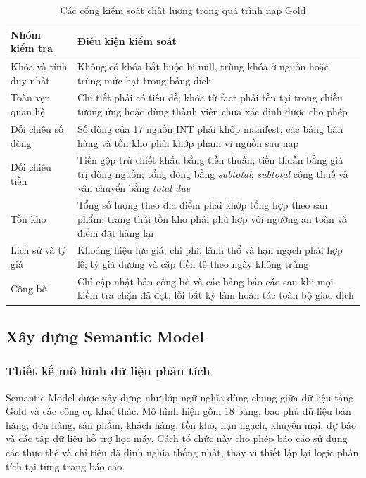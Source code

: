 \begin{table}[H]\centering
\caption{Các cổng kiểm soát chất lượng trong quá trình nạp Gold}
\label{tab:gold-dq-gates}
\begin{tabularx}{\textwidth}{|p{4.2cm}|X|}\hline
\textbf{Nhóm kiểm tra} & \textbf{Điều kiện kiểm soát} \\ \hline
Khóa và tính duy nhất & Không có khóa bắt buộc bị null, trùng khóa ở nguồn hoặc trùng mức hạt trong bảng đích \\ \hline
Toàn vẹn quan hệ & Chi tiết phải có tiêu đề; khóa từ fact phải tồn tại trong chiều tương ứng hoặc dùng thành viên chưa xác định được cho phép \\ \hline
Đối chiếu số dòng & Số dòng của 17 nguồn INT phải khớp manifest; các bảng bán hàng và tồn kho phải khớp phạm vi nguồn sau nạp \\ \hline
Đối chiếu tiền & Tiền gộp trừ chiết khấu bằng tiền thuần; tiền thuần bằng giá trị dòng nguồn; tổng dòng bằng \textit{subtotal}; \textit{subtotal} cộng thuế và vận chuyển bằng \textit{total due} \\ \hline
Tồn kho & Tổng số lượng theo địa điểm phải khớp tổng hợp theo sản phẩm; trạng thái tồn kho phải phù hợp với ngưỡng an toàn và điểm đặt hàng lại \\ \hline
Lịch sử và tỷ giá & Khoảng hiệu lực giá, chi phí, lãnh thổ và hạn ngạch phải hợp lệ; tỷ giá dương và cặp tiền tệ theo ngày không trùng \\ \hline
Công bố & Chỉ cập nhật bản công bố và các bảng báo cáo sau khi mọi kiểm tra chặn đã đạt; lỗi bất kỳ làm hoàn tác toàn bộ giao dịch \\ \hline
\end{tabularx}
\end{table}

\subsection{Xây dựng Semantic Model}

\subsubsection{Thiết kế mô hình dữ liệu phân tích}

Semantic Model được xây dựng như lớp ngữ nghĩa dùng chung giữa dữ liệu tầng Gold và các công cụ khai thác. Mô hình hiện gồm 18 bảng, bao phủ dữ liệu bán hàng, đơn hàng, sản phẩm, khách hàng, tồn kho, hạn ngạch, khuyến mại, dự báo và các tập dữ liệu hỗ trợ học máy. Cách tổ chức này cho phép báo cáo sử dụng các thực thể và chỉ tiêu đã định nghĩa thống nhất, thay vì thiết lập lại logic phân tích tại từng trang báo cáo.

